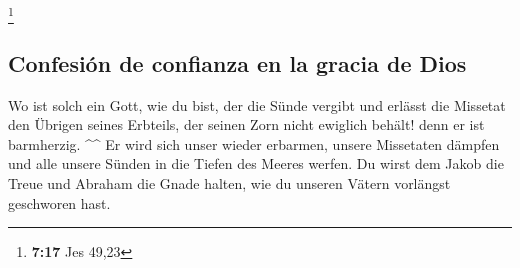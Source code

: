 \footnote{\textbf{7:17} Jes 49,23}

\hypertarget{confesiuxf3n-de-confianza-en-la-gracia-de-dios}{%
\subsection{Confesión de confianza en la gracia de
Dios}\label{confesiuxf3n-de-confianza-en-la-gracia-de-dios}}

 Wo ist solch ein Gott, wie du bist, der die Sünde
vergibt und erlässt die Missetat den Übrigen seines Erbteils, der seinen
Zorn nicht ewiglich behält! denn er ist barmherzig. \^{}\^{}
 Er wird sich unser wieder erbarmen, unsere Missetaten
dämpfen und alle unsere Sünden in die Tiefen des Meeres werfen.
 Du wirst dem Jakob die Treue und Abraham die Gnade
halten, wie du unseren Vätern vorlängst geschworen hast.

